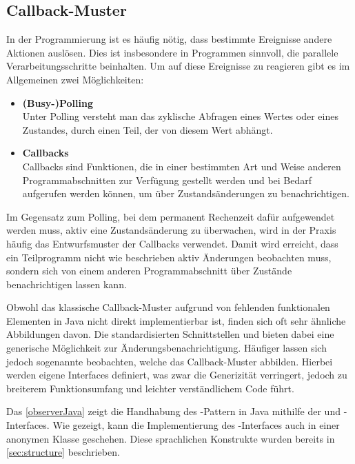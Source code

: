 \subsection{Callback-Muster}
In der Programmierung ist es häufig nötig, dass bestimmte Ereignisse andere Aktionen auslösen. Dies ist insbesondere in Programmen sinnvoll, die parallele Verarbeitungsschritte beinhalten. Um auf diese Ereignisse zu reagieren gibt es im Allgemeinen zwei Möglichkeiten: 

\begin{itemize}
    \item \textbf{(Busy-)Polling}\\
    Unter Polling versteht man das zyklische Abfragen eines Wertes oder eines Zustandes, durch einen Teil, der von diesem Wert abhängt.
    \item \textbf{Callbacks}\\
    Callbacks sind Funktionen, die in einer bestimmten Art und Weise anderen Programmabschnitten zur Verfügung gestellt werden und bei Bedarf aufgerufen werden können, um \zB über Zustandsänderungen zu benachrichtigen.
\end{itemize}

Im Gegensatz zum Polling, bei dem permanent Rechenzeit dafür aufgewendet werden muss, aktiv eine Zustandsänderung zu überwachen, wird in der Praxis häufig das Entwurfsmuster der Callbacks verwendet. Damit wird erreicht, dass ein Teilprogramm nicht wie beschrieben aktiv Änderungen beobachten muss, sondern sich von einem anderen Programmabschnitt über Zustände benachrichtigen lassen kann. 

Obwohl das klassische Callback-Muster aufgrund von fehlenden funktionalen Elementen in Java nicht direkt implementierbar ist, finden sich oft sehr ähnliche Abbildungen davon. Die standardisierten Schnittstellen   und  bieten dabei eine generische Möglichkeit zur Änderungsbenachrichtigung. Häufiger lassen sich jedoch sogenannte  beobachten, welche das Callback-Muster abbilden. Hierbei werden eigene Interfaces definiert, was zwar die Generizität verringert, jedoch zu breiterem Funktionsumfang und leichter verständlichem Code führt.

Das \autoref{observerJava} zeigt die Handhabung des -Pattern \cite{gamma_design_1995} in Java mithilfe der  und -Interfaces. Wie gezeigt, kann die Implementierung des -Interfaces auch in einer anonymen Klasse geschehen. Diese sprachlichen Konstrukte wurden bereits in \autoref{sec:structure} beschrieben. 

